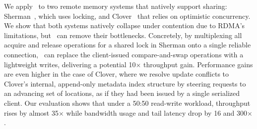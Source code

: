 We apply \sword\ to two remote memory systems that natively
support sharing: Sherman~\cite{sherman}, which uses locking, and Clover~\cite{clover} that relies on optimistic concurrency.
We show that both systems natively collapse under contention due to RDMA's
limitations, but \sword\ can remove their bottlenecks.  Concretely, 
by multiplexing all acquire and release operations for a shared lock
in Sherman onto a single reliable connection, \sword\ can
replace the client-issued compare-and-swap operations
with a lightweight writes, delivering a potential 10$\times$ throughput gain.  Performance gains are even higher in the case of Clover,
where
we resolve update conflicts to Clover's internal, append-only metadata
index structure by steering requests to an advancing set of locations,
as if they had been issued by a single serialized client.
Our evaluation shows that
under a 50:50 read-write workload, throughput
rises by almost 35$\times$ while bandwidth usage and tail
latency drop by 16 and 300$\times$.



